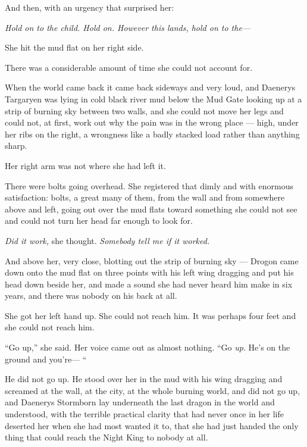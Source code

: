 And then, with an urgency that surprised her:

\textit{Hold on to the child. Hold on. However this lands, hold on to the—}

She hit the mud flat on her right side.

\sceneBreak

There was a considerable amount of time she could not account for.

When the world came back it came back sideways and very loud, and Daenerys Targaryen was lying in cold black river mud below the Mud Gate looking up at a strip of burning sky between two walls, and she could not move her legs and could not, at first, work out why the pain was in the wrong place — high, under her ribs on the right, a wrongness like a badly stacked load rather than anything sharp.

Her right arm was not where she had left it.

There were bolts going overhead. She registered that dimly and with enormous satisfaction: bolts, a great many of them, from the wall and from somewhere above and left, going out over the mud flats toward something she could not see and could not turn her head far enough to look for.

\textit{Did it work,} she thought. \textit{Somebody tell me if it worked.}

And above her, very close, blotting out the strip of burning sky — Drogon came down onto the mud flat on three points with his left wing dragging and put his head down beside her, and made a sound she had never heard him make in six years, and there was nobody on his back at all.

She got her left hand up. She could not reach him. It was perhaps four feet and she could not reach him.

“Go up,” she said. Her voice came out as almost nothing. “Go \textit{up}. He’s on the ground and you’re— “

He did not go up. He stood over her in the mud with his wing dragging and screamed at the wall, at the city, at the whole burning world, and did not go up, and Daenerys Stormborn lay underneath the last dragon in the world and understood, with the terrible practical clarity that had never once in her life deserted her when she had most wanted it to, that she had just handed the only thing that could reach the Night King to nobody at all.